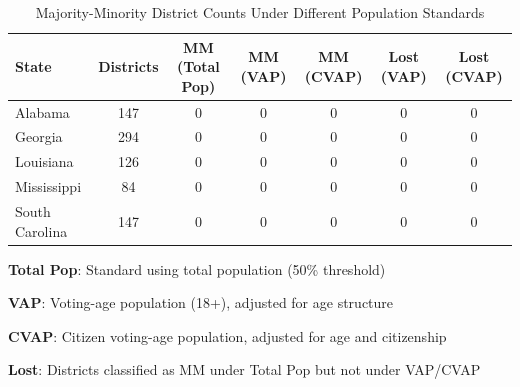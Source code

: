 
\begin{table}[H]
\centering
\caption{Majority-Minority District Counts Under Different Population Standards}
\label{tab:mm_counts_by_standard}
\begin{tabular}{lcccccc}
\toprule
\textbf{State} & \textbf{Districts} & \textbf{MM (Total Pop)} & \textbf{MM (VAP)} & \textbf{MM (CVAP)} & \textbf{Lost (VAP)} & \textbf{Lost (CVAP)} \\
\midrule
Alabama & 147 & 0 & 0 & 0 & 0 & 0 \\
Georgia & 294 & 0 & 0 & 0 & 0 & 0 \\
Louisiana & 126 & 0 & 0 & 0 & 0 & 0 \\
Mississippi & 84 & 0 & 0 & 0 & 0 & 0 \\
South Carolina & 147 & 0 & 0 & 0 & 0 & 0 \\
\bottomrule
\end{tabular}
\begin{tablenotes}
\small
\item \textbf{Total Pop}: Standard using total population (50\% threshold)
\item \textbf{VAP}: Voting-age population (18+), adjusted for age structure
\item \textbf{CVAP}: Citizen voting-age population, adjusted for age and citizenship
\item \textbf{Lost}: Districts classified as MM under Total Pop but not under VAP/CVAP
\end{tablenotes}
\end{table}
